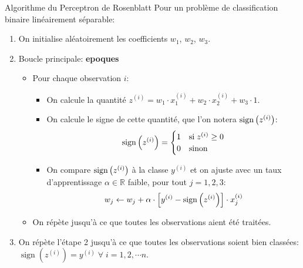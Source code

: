 \begin{frame}{Algorithme du Perceptron de Rosenblatt}
	Pour un problème de classification binaire linéairement séparable:
	\begin{enumerate}
		\item On initialise aléatoirement les coefficients $w_1$, $w_2$, $w_3$.
		\pause
		\item Boucle principale: \textbf{epoques}
		\pause
		\begin{itemize}
			\item Pour chaque observation $i$:
			\begin{itemize}
				\item On calcule la quantité $z^{(i)} = w_1 \cdot x_1^{(i)} + w_2 \cdot x_2^{(i)} + w_3 \cdot 1$.
				\pause
				\item On calcule le signe de cette quantité, que l'on notera $\operatorname{sign}\left(z^{(i)}\right)$:
				\begin{equation*}
					\operatorname{sign}\left(z^{(i)}\right) = 
					\begin{cases}
						1 & \text{si} \; z^{(i)} \ge 0 \\
						0 & \text{sinon}
					\end{cases}
				\end{equation*}
				\item On compare $\operatorname{sign}\left(z^{(i)}\right)$ à la classe $y^{(i)}$ et on ajuste avec un taux d'apprentissage $\alpha \in \mathbb{R}$ faible, pour tout $j = 1, 2, 3$:
				\begin{equation*}
					w_j \leftarrow w_j + \alpha \cdot \left[y^{(i)} - \operatorname{sign}\left(z^{(i)}\right)\right] \cdot x_j^{(i)}
				\end{equation*}
			\end{itemize}
			\pause
			\item On répète jusqu'à ce que toutes les observations aient été traitées.
		\end{itemize}
		\pause
		\item On répète l'étape 2 jusqu'à ce que toutes les observations soient bien classées: $\operatorname{sign}(z^{(i)}) = y^{(i)} \; \forall \; i=1, 2, \cdots n$.
	\end{enumerate}
\end{frame}

